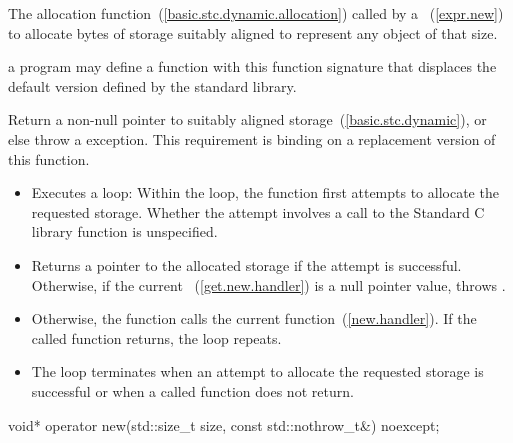 \begin{itemdescr}
\pnum
\effects
The
allocation function~(\ref{basic.stc.dynamic.allocation})
called by a
~(\ref{expr.new})
to allocate
 bytes of storage suitably aligned to represent any object
of that size.

\pnum
\replaceable
a \Cpp program may define a function with this function signature
that displaces the default version defined by the
\Cpp standard library.

\pnum
\required 
Return a non-null pointer to suitably aligned storage~(\ref{basic.stc.dynamic}),
or else throw a
%
exception.
This requirement is binding on a replacement version of this function.

\pnum
{}

\begin{itemize}
\item
Executes a loop:
Within the loop, the function first attempts to allocate the requested storage.
Whether the attempt involves a call to the Standard C library function
is unspecified.
%
\item
Returns a pointer to the allocated storage if the attempt is successful.
Otherwise, if the
current ~(\ref{get.new.handler}) is
a null pointer value, throws
.
\item
Otherwise, the function calls the current
 function~(\ref{new.handler}).
If the called function returns, the loop repeats.
\item
The loop terminates when an attempt to allocate the requested storage is
successful or when a called
function does not return.
\end{itemize}
\end{itemdescr}

%
\begin{itemdecl}
void* operator new(std::size_t size, const std::nothrow_t&) noexcept;
\end{itemdecl}

